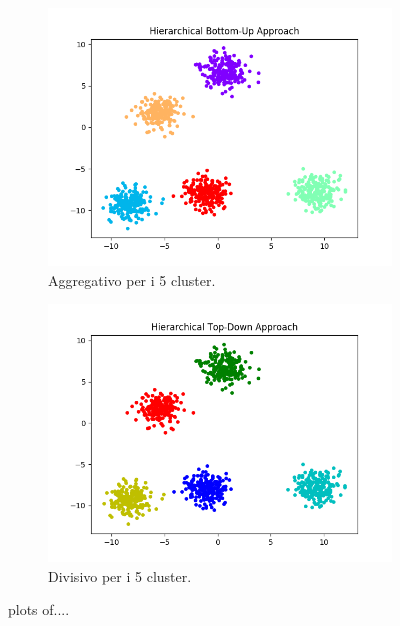 \documentclass{llncs}
\begin{document}
	\begin{figure}[h]
		\begin{subfigure}{.5\textwidth}
		  \centering
		  \includegraphics[width=\linewidth]{immagini/5_clusters_agg.png}
		  \caption{Aggregativo per i 5 cluster.}
		  \label{hier_normal:a}
		\end{subfigure}%
		\begin{subfigure}{.5\textwidth}
		  \centering
		  \includegraphics[width=\linewidth]{immagini/5_clusters_div.png}
		  \caption{Divisivo per i 5 cluster.}
		  \label{hier_normal:b}
		\end{subfigure}
		\caption{plots of....}
		\label{hier_normal:test}
	\end{figure}
	
\end{document}
